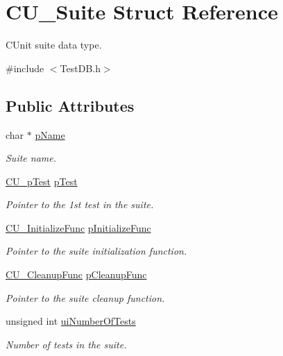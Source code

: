 \hypertarget{struct_c_u___suite}{\section{C\+U\+\_\+\+Suite Struct Reference}
\label{struct_c_u___suite}
}


C\+Unit suite data type.  




{\ttfamily \#include $<$Test\+D\+B.\+h$>$}

\subsection*{Public Attributes}
\begin{DoxyCompactItemize}
\item 
char $\ast$ \hyperlink{struct_c_u___suite_ac70274e00c1c5b7b6a8368c9a0ab6195}{p\+Name}
\begin{DoxyCompactList}\small\item\em Suite name. \end{DoxyCompactList}\item 
\hyperlink{group___framework_ga249c43fbe4e53452b3f90db1437da04b}{C\+U\+\_\+p\+Test} \hyperlink{struct_c_u___suite_ad56c4b9f273fdc8c3f504b62178dfdd6}{p\+Test}
\begin{DoxyCompactList}\small\item\em Pointer to the 1st test in the suite. \end{DoxyCompactList}\item 
\hyperlink{group___framework_gaab4b8ad3aa3a3c222c43c8a330de11e3}{C\+U\+\_\+\+Initialize\+Func} \hyperlink{struct_c_u___suite_a572516b68f25492ac8e8ac720debfdb3}{p\+Initialize\+Func}
\begin{DoxyCompactList}\small\item\em Pointer to the suite initialization function. \end{DoxyCompactList}\item 
\hyperlink{group___framework_ga90966c0bede742195897c3aeff4c342b}{C\+U\+\_\+\+Cleanup\+Func} \hyperlink{struct_c_u___suite_aee36fd856e07775ba3cbb91af2219c25}{p\+Cleanup\+Func}
\begin{DoxyCompactList}\small\item\em Pointer to the suite cleanup function. \end{DoxyCompactList}\item 
unsigned int \hyperlink{struct_c_u___suite_ac35747775ea5ffbb4cc1a2eb17dd1ca3}{ui\+Number\+Of\+Tests}
\begin{DoxyCompactList}\small\item\em Number of tests in the suite. \end{DoxyCompactList}\item 

\end{DoxyCompactItemize}
